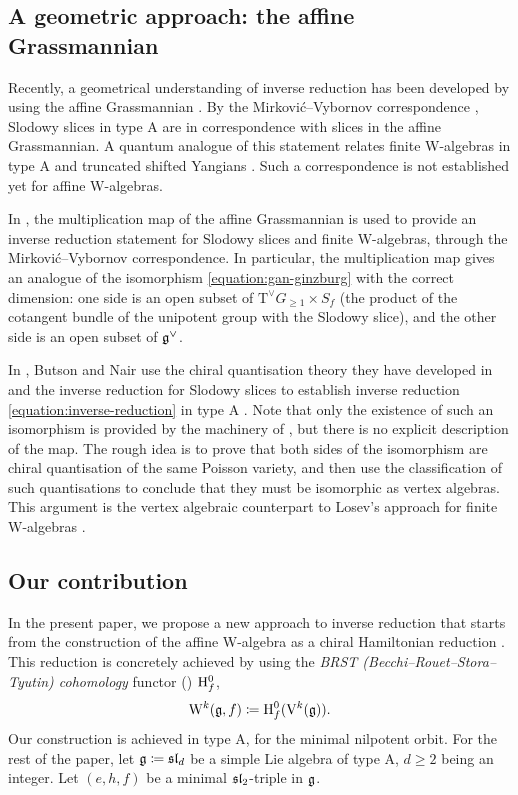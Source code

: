 \subsection{A geometric approach: the affine Grassmannian}


Recently, a geometrical understanding of inverse reduction has been developed by using the affine Grassmannian \cite{kamnitzer2022hamiltonian,butson2025inverse,butson2025inverse-affine}. By the Mirkovi\'c--Vybornov correspondence \cite{mirkovic2022comparison}, Slodowy slices in type A are in correspondence with slices in the affine Grassmannian. A quantum analogue of this statement relates finite W-algebras in type A and truncated shifted Yangians \cite{webster2020quantum}. Such a correspondence is not established yet for affine W-algebras.

In \cite{kamnitzer2022hamiltonian,butson2025inverse}, the multiplication map of the affine Grassmannian is used to provide an inverse reduction statement for Slodowy slices and finite W-algebras, through the Mirkovi\'c--Vybornov correspondence. In particular, the multiplication map gives an analogue of the isomorphism \eqref{equation:gan-ginzburg} with the correct dimension: one side is an open subset of $\mathrm{T}^\vee G_{\geqslant 1} \times S_f$ (the product of the cotangent bundle of the unipotent group with the Slodowy slice), and the other side is an open subset of $\g^\vee$.

In \cite{butson2025inverse-affine}, Butson and Nair use the chiral quantisation theory they have developed in \cite{butson2026deformation} and the inverse reduction for Slodowy slices to establish inverse reduction \eqref{equation:inverse-reduction} in type A \cite[Section 6.3]{butson2025inverse-affine}. Note that only the existence of such an isomorphism is provided by the machinery of \cite{butson2026deformation}, but there is no explicit description of the map. The rough idea is to prove that both sides of the isomorphism are chiral quantisation of the same Poisson variety, and then use the classification of such quantisations to conclude that they must be isomorphic as vertex algebras. This argument is the vertex algebraic counterpart to Losev's approach for finite W-algebras \cite{losev2010quantized}.

\subsection{Our contribution}

In the present paper, we propose a new approach to inverse reduction that starts from the construction of the affine W-algebra as a chiral Hamiltonian reduction \cite{feigin1990quantization,kac2003quantum}. This reduction is concretely achieved by using the \emph{BRST (Becchi–Rouet–Stora–Tyutin) cohomology} functor () $\Hgy^0_f$,
\[ \W^k(\g, f) \coloneqq \Hgy^0_f(\V^k(\g)). \]
Our construction is achieved in type A, for the minimal nilpotent orbit. For the rest of the paper, let $\g \coloneqq \sl_d$ be a simple Lie algebra of type A, $d \geqslant 2$ being an integer. Let $(e, h, f)$ be a minimal $\sl_2$-triple in $\g$.

